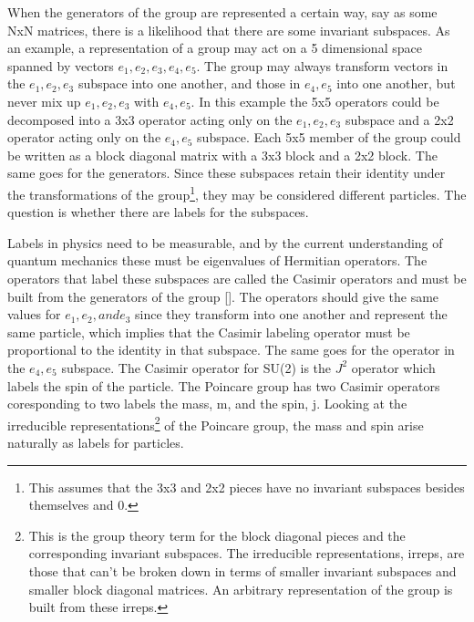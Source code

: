 When the generators of the group are represented a certain way, say as some NxN matrices, there is a likelihood that there are some invariant subspaces. As an example, a representation of a group may act on a 5 dimensional space spanned by vectors $e_1, e_2, e_3, e_4, e_5$. The group may always transform vectors in the $e_1, e_2, e_3$ subspace into one another, and those in $e_4, e_5$ into one another, but never mix up $e_1, e_2, e_3$ with $e_4, e_5$. In this example the 5x5 operators could be decomposed into a 3x3 operator acting only on the $e_1, e_2, e_3$ subspace and a 2x2 operator acting only on the $e_4, e_5$ subspace. Each 5x5 member of the group could be written as a block diagonal matrix with a 3x3 block and a 2x2 block. The same goes for the generators. Since these subspaces retain their identity under the transformations of the group\footnote{This assumes that the 3x3 and 2x2 pieces have no invariant subspaces besides themselves and 0.}, they may be considered different particles. The question is whether there are labels for the subspaces.  

Labels in physics need to be measurable, and by the current understanding of quantum mechanics these must be eigenvalues of Hermitian operators. The operators that label these subspaces are called the Casimir operators and must be built from the generators of the group [\cite{weinberg,wigner}]. The operators should give the same values for $e_1, e_2, and e_3$ since they transform into one another and represent the same particle, which implies that the Casimir labeling operator must be proportional to the identity in that subspace. The same goes for the operator in the $e_4, e_5$ subspace. The Casimir operator for SU(2) is the $J^2$ operator which labels the spin of the particle. The Poincare group has two Casimir operators coresponding to two labels the mass, m, and the spin, j. Looking at the irreducible representations\footnote{This is the group theory term for the block diagonal pieces and the corresponding invariant subspaces. The irreducible representations, irreps, are those that can't be broken down in terms of smaller invariant subspaces and smaller block diagonal matrices. An arbitrary representation of the group is built from these irreps.} of the Poincare group, the mass and spin arise naturally as labels for particles. 


